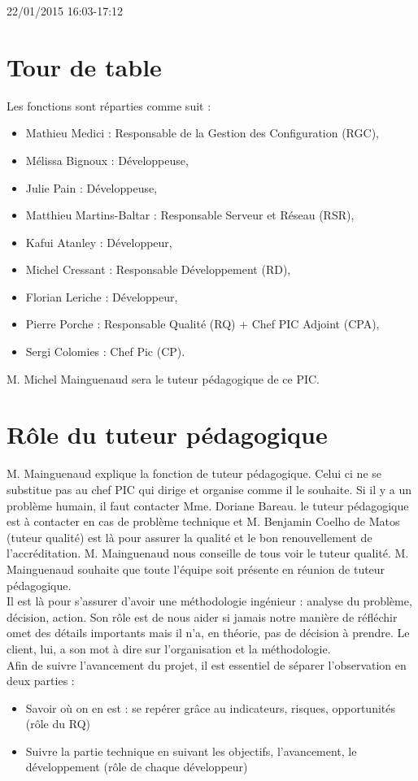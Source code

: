 \documentclass [a4paper] {article}
\begin{document}
22/01/2015			 				%
\hfill   
\hfill 	 16:03-17:12 				%





\section{Tour de table}
Les fonctions sont réparties comme suit :
\begin{itemize}
	\item Mathieu Medici : Responsable de la Gestion des Configuration (RGC),
	\item Mélissa Bignoux : Développeuse,
	\item Julie Pain : Développeuse,
	\item Matthieu Martins-Baltar : Responsable Serveur et Réseau (RSR),
	\item Kafui Atanley : Développeur,
	\item Michel Cressant : Responsable Développement (RD),
	\item Florian Leriche : Développeur,
	\item Pierre Porche : Responsable Qualité (RQ) + Chef PIC Adjoint (CPA),
	\item Sergi Colomies : Chef Pic (CP).
\end{itemize}
M. Michel Mainguenaud sera le tuteur pédagogique de ce PIC.

\section{Rôle du tuteur pédagogique}
M. Mainguenaud explique la fonction de tuteur pédagogique.
Celui ci ne se substitue pas au chef PIC qui dirige et organise comme il le souhaite.
Si il y a un problème humain, il faut contacter Mme. Doriane Bareau. le tuteur pédagogique est à contacter en cas de problème technique et M. Benjamin Coelho de Matos (tuteur qualité) est là pour assurer la qualité et le bon renouvellement de l’accréditation. M. Mainguenaud nous conseille de tous voir le tuteur qualité.
M. Mainguenaud souhaite que toute l'équipe soit présente en réunion de tuteur pédagogique.
\\
Il est là pour s'assurer d'avoir une méthodologie ingénieur : analyse du problème, décision, action. Son rôle est de nous aider si jamais notre manière de réfléchir omet des détails importants mais il n'a, en théorie, pas de décision à prendre.
Le client, lui, a son mot à dire sur l'organisation et la méthodologie.
\\
Afin de suivre l'avancement du projet, il est essentiel de séparer l'observation en deux parties :
\begin{itemize}
\item Savoir où on en est : se repérer grâce au indicateurs, risques, opportunités (rôle du RQ)
\item Suivre la partie technique en suivant les objectifs, l'avancement, le développement (rôle de chaque développeur)
\end{itemize}
\end{document}
